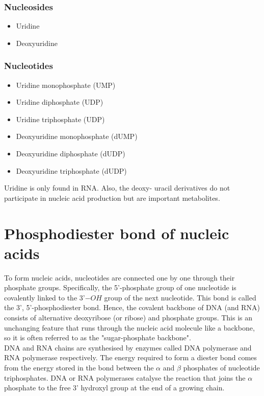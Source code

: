 \documentclass[11pt]{article}
\begin{document}
\subsubsection{Nucleosides}
\label{sec:org9d9452e}
\begin{itemize}
\item Uridine
\item Deoxyuridine
\end{itemize}

\subsubsection{Nucleotides}
\label{sec:org5a099f0}
\begin{itemize}
\item Uridine monophosphate (UMP)
\item Uridine diphosphate (UDP)
\item Uridine triphosphate (UDP)
\item Deoxyuridine monophosphate (dUMP)
\item Deoxyuridine diphosphate (dUDP)
\item Deoxyuridine triphosphate (dUDP)
\end{itemize}

Uridine is only found in RNA. Also, the deoxy- uracil derivatives do not participate in nucleic acid production but are important metabolites.

\newpage

\section{Phosphodiester bond of nucleic acids}
\label{sec:org6e19b49}
To form nucleic acids, nucleotides are connected one by one through their phosphate groups. Specifically, the 5'-phosphate group of one nucleotide is covalently linked to the 3'\(-OH\) group of the next nucleotide. This bond is called the 3', 5'-phosphodiester bond. Hence, the covalent backbone of DNA (and RNA) consists of alternative deoxyribose (or ribose) and phosphate groups. This is an unchanging feature that runs through the nucleic acid molecule like a backbone, so it is often referred to as the "sugar-phosphate backbone".
\\[0pt]

DNA and RNA chains are synthesised by enzymes called DNA polymerase and RNA polymerase respectively. The energy required to form a diester bond comes from the energy stored in the bond between the \(\alpha\) and \(\beta\) phosphates of nucleotide triphosphates. DNA or RNA polymerases catalyse the reaction that joins the \(\alpha\) phosphate to the free 3' hydroxyl group at the end of a growing chain.
\end{document}
